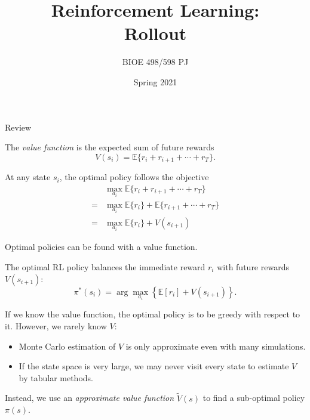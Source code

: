 \documentclass[9pt]{beamer}
\title{Reinforcement Learning:\\Rollout}
\author{BIOE 498/598 PJ}
\date{Spring 2021}
\newcommand\pskip{\pause\bigskip}
\begin{document}
\frame{\titlepage}

\begin{frame}{Review}

The \emph{value function} is the expected sum of future rewards
\[ V(s_i) = \mathbb{E}\{ r_i + r_{i+1} + \cdots + r_T \}. \]

\bigskip
At any state $s_i$, the optimal policy follows the objective
\begin{align*} 
	 & \max_{a_i} \mathbb{E}\{ r_i + r_{i+1} + \cdots + r_T \} \\
	=& \max_{a_i} \mathbb{E}\{r_i\} + \mathbb{E}\{r_{i+1} + \cdots + r_T \} \\
	=& \max_{a_i} \mathbb{E}\{r_i\} + V(s_{i+1})
\end{align*}

\end{frame}

\begin{frame}{Optimal policies can be found with a value function.}

The optimal RL policy balances the immediate reward $r_i$ with future rewards $V(s_{i+1})$:
	\[ \pi^*(s_i) = \arg \max_{a_i}\left\{ \mathbb{E}[r_i] + V(s_{i+1}) \right\}. \]
	
\pskip
If we know the value function, the optimal policy is to be greedy with respect to it. However, we rarely know $V$:
\begin{itemize}
	\item Monte Carlo estimation of $V$ is only approximate even with many simulations.
	\item If the state space is very large, we may never visit every state to estimate $V$ by tabular methods.
\end{itemize}

\pskip
Instead, we use an \emph{approximate value function} $\widetilde{V}(s)$ to find a sub-optimal policy $\pi(s)$.
\end{frame}
\end{document}
